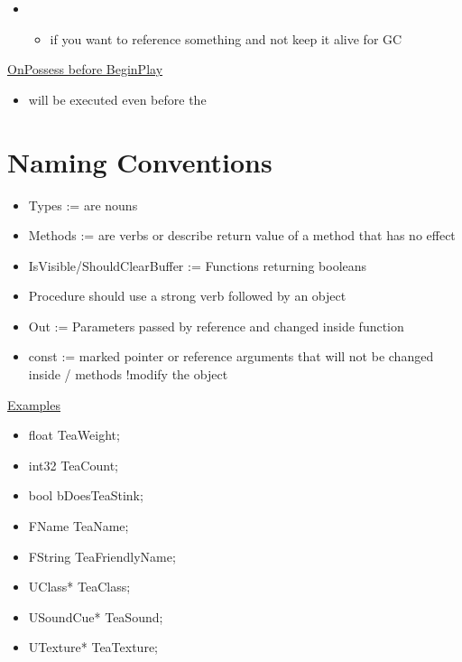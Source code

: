         \begin{itemize}
            \item {}
            \begin{itemize}
                \item if you want to reference something and not keep it alive for GC
            \end{itemize}
        \end{itemize}

        \uline{OnPossess before BeginPlay}
            \begin{itemize}
                \item {} will be executed even before the 
            \end{itemize}


    \section{Naming Conventions}
        \begin{itemize}
            \item Types := are nouns
            \item Methods := are verbs or describe return value of a method that has no effect
            \item IsVisible/ShouldClearBuffer := Functions returning booleans
            \item Procedure should use a strong verb followed by an object
            \item Out := Parameters passed by reference and changed inside function
            \item const := marked pointer or reference arguments that will not be changed inside / methods !modify the object
        \end{itemize}
        \uline{Examples}
        \begin{itemize}
            \item float TeaWeight;
            \item int32 TeaCount;
            \item bool bDoesTeaStink;
            \item FName TeaName;
            \item FString TeaFriendlyName;
            \item UClass* TeaClass;
            \item USoundCue* TeaSound;
            \item UTexture* TeaTexture;
        \end{itemize}
